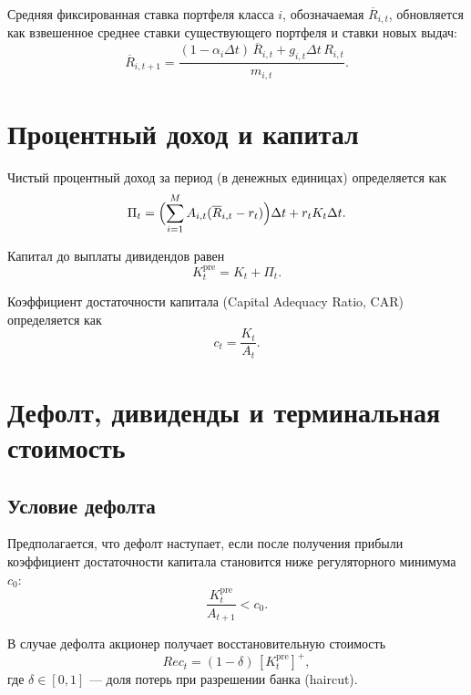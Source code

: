 \documentclass[11pt,a4paper]{article}
\newcommand{\1}{\mathbf{1}}
\newcommand{\pos}[1]{\left[#1\right]^+}
\begin{document}
Средняя фиксированная ставка портфеля класса $i$, обозначаемая $\overline{R}_{i,t}$, обновляется как взвешенное среднее ставки существующего портфеля и ставки новых выдач:
\begin{equation}
    \overline{R}_{i,t+1}
    =
    \frac{
    (1-\alpha_i\Delta t)\,\overline{R}_{i,t}
    +
    g_{i,t}\Delta t\,R_{i,t}
    }
    {m_{i,t}}.
\end{equation}

\section{Процентный доход и капитал}

Чистый процентный доход за период (в денежных единицах) определяется как
\begin{equation}
    \Pi_t =
    \Bigl(
    \sum_{i=1}^{M}
    A_{i,t}
    (\overline{R}_{i,t}-r_t)
    \Bigr)\Delta t
    +
    r_tK_t\Delta t.
\end{equation}

Капитал до выплаты дивидендов равен
\begin{equation}
    K_t^{\text{pre}}
    =
    K_t+\Pi_t.
\end{equation}

Коэффициент достаточности капитала (Capital Adequacy Ratio, CAR) определяется как
\begin{equation}
    c_t=\frac{K_t}{A_t}.
\end{equation}

\section{Дефолт, дивиденды и терминальная стоимость}

\subsection{Условие дефолта}

Предполагается, что дефолт наступает, если после получения прибыли коэффициент достаточности капитала становится ниже регуляторного минимума $c_0$:
\begin{equation}
    \frac{K_t^{\text{pre}}}{A_{t+1}}<c_0.
\end{equation}

В случае дефолта акционер получает восстановительную стоимость
\begin{equation}
    Rec_t=(1-\delta)\,\pos{K_t^{\text{pre}}},
\end{equation}
где $\delta\in[0,1]$ --- доля потерь при разрешении банка (haircut).
\end{document}

